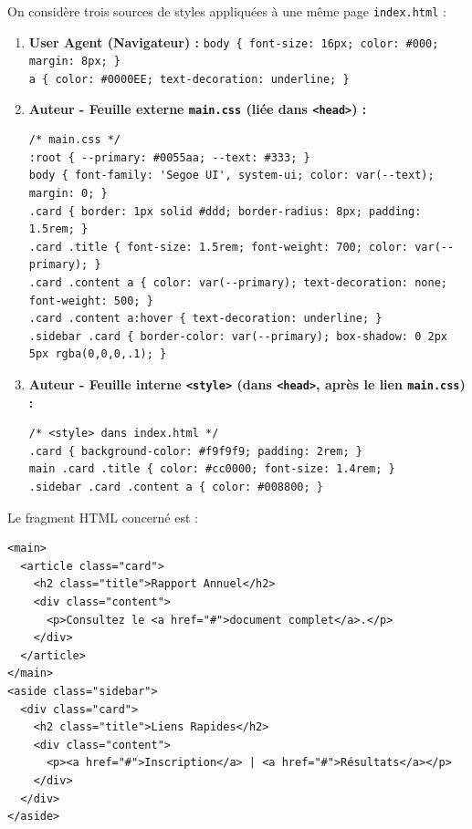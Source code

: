 \documentclass[11pt]{article}
\begin{document}
\begin{exercice}
On considère trois sources de styles appliquées à une même page \texttt{index.html} :
\begin{enumerate}
    \item \textbf{User Agent (Navigateur) :} \texttt{body \{ font-size: 16px; color: \#000; margin: 8px; \}} \\
          \texttt{a \{ color: \#0000EE; text-decoration: underline; \}}
    \item \textbf{Auteur - Feuille externe \texttt{main.css} (liée dans \texttt{<head>}) :}
\begin{verbatim}
/* main.css */
:root { --primary: #0055aa; --text: #333; }
body { font-family: 'Segoe UI', system-ui; color: var(--text); margin: 0; }
.card { border: 1px solid #ddd; border-radius: 8px; padding: 1.5rem; }
.card .title { font-size: 1.5rem; font-weight: 700; color: var(--primary); }
.card .content a { color: var(--primary); text-decoration: none; font-weight: 500; }
.card .content a:hover { text-decoration: underline; }
.sidebar .card { border-color: var(--primary); box-shadow: 0 2px 5px rgba(0,0,0,.1); }
\end{verbatim}
    \item \textbf{Auteur - Feuille interne \texttt{<style>} (dans \texttt{<head>}, après le lien \texttt{main.css}) :}
\begin{verbatim}
/* <style> dans index.html */
.card { background-color: #f9f9f9; padding: 2rem; }
main .card .title { color: #cc0000; font-size: 1.4rem; }
.sidebar .card .content a { color: #008800; }
\end{verbatim}
\end{enumerate}
Le fragment HTML concerné est :
\begin{verbatim}
<main>
  <article class="card">
    <h2 class="title">Rapport Annuel</h2>
    <div class="content">
      <p>Consultez le <a href="#">document complet</a>.</p>
    </div>
  </article>
</main>
<aside class="sidebar">
  <div class="card">
    <h2 class="title">Liens Rapides</h2>
    <div class="content">
      <p><a href="#">Inscription</a> | <a href="#">Résultats</a></p>
    </div>
  </div>
</aside>
\end{verbatim}


\end{exercice}
\end{document}
